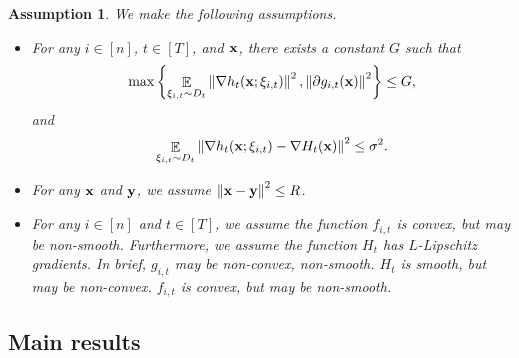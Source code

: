 \documentclass{article}
\newtheorem{Assumption}{\bf{Assumption}}
\begin{document}
\begin{Assumption}
\label{assumption_bounded_gradient_domain}
We make the following assumptions.
\begin{itemize}
\item For any $i\in[n]$, $t\in[T]$, and ${\bf x}$, there exists a constant $G$ such that
\begin{align}
\nonumber
\max\left\{ \mathop{\mathbb{E}}_{ \xi_{i,t} \sim D_t }\left\lVert\nabla h_t({\bf x};\xi_{i,t})\right\rVert^2,  \left\lVert\partial g_{i,t}({\bf x})\right\rVert^2 \right\} \le G,
\end{align} and 
\begin{align}
\nonumber
\mathop{\mathbb{E}}_{ \xi_{i,t} \sim D_t } \left\lVert\nabla h_t({\bf x}; \xi_{i,t}) - \nabla H_t({\bf x})\right\rVert^2 \le \sigma^2.
\end{align}
\item For any ${\bf x}$ and ${\bf y}$, we assume $\left\lVert{\bf x}-{\bf y}\right\rVert^2 \le R$.
\item {\color{blue} For any $i\in[n]$ and $t\in[T]$, we assume the function $f_{i,t}$ is convex, but may be non-smooth. Furthermore, we assume the function $H_t$ has  $L$-Lipschitz gradients. In brief, $g_{i,t}$ may be non-convex, non-smooth. $H_t$ is smooth, but may be non-convex. $f_{i,t}$ is convex, but may be non-smooth.}
\end{itemize}
\end{Assumption}




\subsection{Main results}
\end{document}
